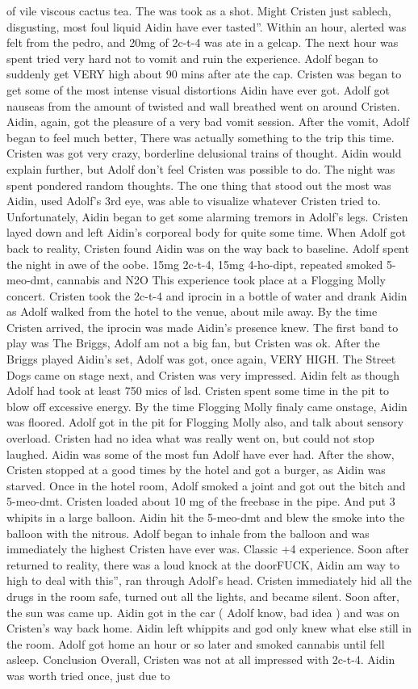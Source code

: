 \documentclass[12pt]{book}
\begin{document}
of vile viscous cactus tea. The was took as a shot. Might Cristen just sablech, disgusting, most foul liquid Aidin have ever tasted''. Within an hour, alerted was felt from the pedro, and 20mg of 2c-t-4 was ate in a gelcap. The next hour was spent tried very hard not to vomit and ruin the experience. Adolf began to suddenly get VERY high about 90 mins after ate the cap. Cristen was began to get some of the most intense visual distortions Aidin have ever got. Adolf got nauseas from the amount of twisted and wall breathed went on around Cristen. Aidin, again, got the pleasure of a very bad vomit session. After the vomit, Adolf began to feel much better, There was actually something to the trip this time. Cristen was got very crazy, borderline delusional trains of thought. Aidin would explain further, but Adolf don't feel Cristen was possible to do. The night was spent pondered random thoughts. The one thing that stood out the most was Aidin, used Adolf's 3rd eye, was able to visualize whatever Cristen tried to. Unfortunately, Aidin began to get some alarming tremors in Adolf's legs. Cristen layed down and left Aidin's corporeal body for quite some time. When Adolf got back to reality, Cristen found Aidin was on the way back to baseline. Adolf spent the night in awe of the oobe. 15mg 2c-t-4, 15mg 4-ho-dipt, repeated smoked 5-meo-dmt, cannabis and N2O This experience took place at a Flogging Molly concert. Cristen took the 2c-t-4 and iprocin in a bottle of water and drank Aidin as Adolf walked from the hotel to the venue, about  mile away. By the time Cristen arrived, the iprocin was made Aidin's presence knew. The first band to play was The Briggs, Adolf am not a big fan, but Cristen was ok. After the Briggs played Aidin's set, Adolf was got, once again, VERY HIGH. The Street Dogs came on stage next, and Cristen was very impressed. Aidin felt as though Adolf had took at least 750 mics of lsd. Cristen spent some time in the pit to blow off excessive energy. By the time Flogging Molly finaly came onstage, Aidin was floored. Adolf got in the pit for Flogging Molly also, and talk about sensory overload. Cristen had no idea what was really went on, but could not stop laughed. Aidin was some of the most fun Adolf have ever had. After the show, Cristen stopped at a good times by the hotel and got a burger, as Aidin was starved. Once in the hotel room, Adolf smoked a joint and got out the bitch and 5-meo-dmt. Cristen loaded about 10 mg of the freebase in the pipe. And put 3 whipits in a large balloon. Aidin hit the 5-meo-dmt and blew the smoke into the balloon with the nitrous. Adolf began to inhale from the balloon and was immediately the highest Cristen have ever was. Classic +4 experience. Soon after returned to reality, there was a loud knock at the doorFUCK, Aidin am way to high to deal with this'', ran through Adolf's head. Cristen immediately hid all the drugs in the room safe, turned out all the lights, and became silent. Soon after, the sun was came up. Aidin got in the car ( Adolf know, bad idea ) and was on Cristen's way back home. Aidin left whippits and god only knew what else still in the room. Adolf got home an hour or so later and smoked cannabis until fell asleep. Conclusion Overall, Cristen was not at all impressed with 2c-t-4. Aidin was worth tried once, just due to 
\end{document}
